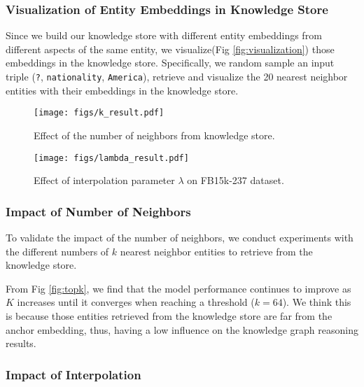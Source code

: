 \documentclass[runningheads]{llncs}
\begin{document}
\subsubsection{\textbf{Visualization of Entity Embeddings in Knowledge Store}}
Since we build our knowledge store with different entity embeddings from different aspects of the same entity, we visualize(Fig \ref{fig:visualization}) those embeddings in the knowledge store.
Specifically, we random sample an input triple (\texttt{?}, \texttt{nationality}, \texttt{America}),  retrieve and visualize the 20 nearest neighbor entities with their embeddings in the knowledge store.



\begin{figure}[htbp]
    \centering \begin{minipage}[b]{0.48\textwidth}
        \centering \texttt{[image: figs/k\_result.pdf]}
        \caption{Effect of the number of neighbors from knowledge store.}
        \label{fig:topk}
    \end{minipage}\hspace{3mm}\begin{minipage}[b]{0.48\textwidth}
        \centering \texttt{[image: figs/lambda\_result.pdf]}
        \caption{Effect of interpolation parameter $\lambda$ on FB15k-237 dataset.}
        \label{fig:lambda}
    \end{minipage}
\end{figure}



\subsubsection{\textbf{Impact of Number of Neighbors}}
To validate the impact of the number of neighbors, we conduct experiments with the different numbers of $k$ nearest neighbor entities to retrieve from the knowledge store.

From  Fig \ref{fig:topk}, we find that the model performance continues to improve as $K$ increases until it converges when reaching a threshold ($k=64$).
We think this is because those entities retrieved from the knowledge store are far from the anchor embedding, thus, having a low influence on the knowledge graph reasoning results.



\subsubsection{\textbf{Impact of Interpolation}}
\end{document}
